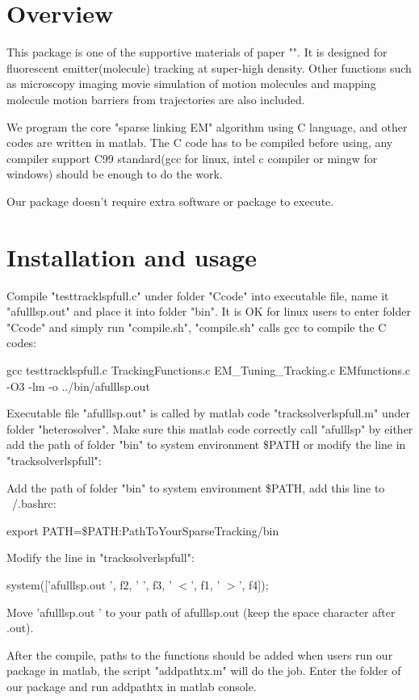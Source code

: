 \documentclass[a4paper]{article}
\begin{document}
\begin{CJK*}{UTF8}{kai}

\section{Overview}
This package is one of the supportive materials of paper "". It is designed for fluorescent emitter(molecule) tracking at super-high density. Other functions such as microscopy imaging movie simulation of motion molecules and mapping molecule motion barriers from trajectories are also included.

We program the core "sparse linking EM" algorithm using C language, and other codes are written in matlab. The C code has to be compiled before using, any compiler support C99 standard(gcc for linux, intel c compiler or mingw for windows) should be enough to do the work.

Our package doesn't require extra software or package to execute.

\section{Installation and usage}

Compile "testtracklspfull.c" under folder "Ccode" into executable file, name it "afulllsp.out" and place it into folder "bin". It is OK for linux users to enter folder "Ccode" and simply run "compile.sh", "compile.sh" calls gcc to compile the C codes:

gcc testtracklspfull.c TrackingFunctions.c EM\_Tuning\_Tracking.c EMfunctions.c -O3 -lm -o ../bin/afulllsp.out

Executable file "afulllsp.out" is called by matlab code "tracksolverlspfull.m" under folder "heterosolver". Make sure this matlab code correctly call "afulllsp" by either add the path of folder "bin" to system environment \$PATH or modify the line in "tracksolverlspfull":

Add the path of folder "bin" to system environment \$PATH, add this line to ~/.bashrc:

export PATH=\$PATH:PathToYourSparseTracking/bin

Modify the line in "tracksolverlspfull": 

system(['afulllsp.out ', f2, ' ', f3, ' $<$', f1, ' $>$', f4]); 

Move 'afulllsp.out ' to your path of afulllsp.out (keep the space character after .out).

After the compile, paths to the functions should be added when users run our package in matlab, the script "addpathtx.m" will do the job. Enter the folder of our package and run addpathtx in matlab console.


\end{CJK*}
\end{document}
